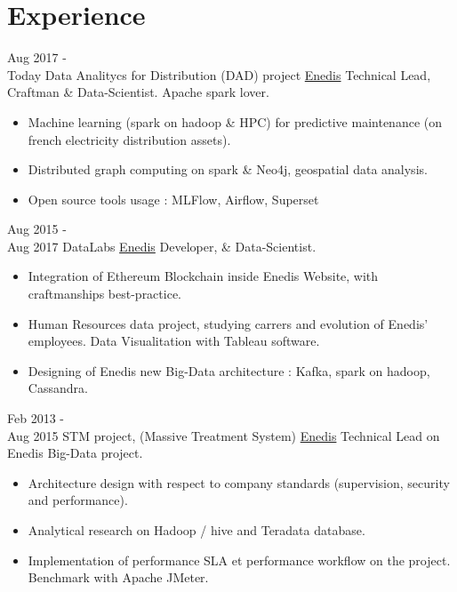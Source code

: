 \documentclass[letterpaper]{twentysecondcv} %
\begin{document}
\makeprofile %




\section{Experience}



\begin{twenty} %

	\twentyitem
    	{Aug 2017 - \\Today}
        {Data Analitycs for Distribution (DAD) project}
        {\href{http://www.enedis.fr/}{Enedis}}
        {Technical Lead, Craftman \& Data-Scientist. Apache spark lover.}
        {
        {\begin{itemize}
        \item Machine learning (spark on hadoop \& HPC) for predictive maintenance (on french electricity distribution assets).
        \item Distributed graph computing on spark \& Neo4j, geospatial data analysis.
		\item Open source tools usage : MLFlow, Airflow, Superset
        
    \end{itemize}}
        }

	\twentyitem
    	{Aug 2015 - \\Aug 2017}
        {DataLabs}
        {\href{http://www.enedis.fr/}{Enedis}}
        {Developer, \& Data-Scientist.}
        {
        {\begin{itemize}
        \item Integration of Ethereum Blockchain inside Enedis Website, with craftmanships best-practice.
        \item Human Resources data project, studying carrers and evolution of Enedis' employees. Data Visualitation with Tableau software.
        \item Designing of Enedis new Big-Data architecture : Kafka, spark on hadoop, Cassandra.
        
    \end{itemize}}
        }
        
\twentyitem
    	{Feb 2013 - \\Aug 2015}
        {STM project, (Massive Treatment System)}
        {\href{http://www.enedis.fr/}{Enedis}}
        {Technical Lead on Enedis Big-Data project.}
        {
        {\begin{itemize}
        \item Architecture design with respect to company standards (supervision, security and performance).
        \item Analytical research on Hadoop / hive and Teradata database.
        \item Implementation of performance SLA et performance workflow on the project. Benchmark with Apache JMeter.
    \end{itemize}}
        }
        

\end{twenty}
\end{document}
